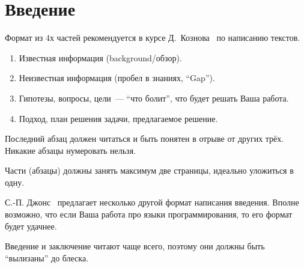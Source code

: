 
\section*{Введение}
\thispagestyle{withCompileDate}

Формат из 4х частей рекомендуется в курсе Д.~Кознова~\cite{koznov} по написанию текстов.

\begin{enumerate}
    \item Известная информация (background/обзор).
    \item Неизвестная информация (пробел в знаниях, \enquote{Gap}).
    \item Гипотезы, вопросы, цели~--- \enquote{что болит}, что будет решать Ваша работа.
    \item Подход, план решения задачи, предлагаемое решение.
\end{enumerate}

Последний абзац должен читаться и быть понятен в отрыве от других трёх.
Никакие абзацы нумеровать нельзя.

Части (абзацы) должны занять максимум две страницы, идеально уложиться в одну.

С.-П. Джонс~\cite{SPJGreatPaper} предлагает несколько другой формат написания введения.
Вполне возможно, что если Ваша работа про языки программирования, то его формат будет удачнее.

Введение и заключение читают чаще всего, поэтому они должны быть \enquote{вылизаны} до блеска.

